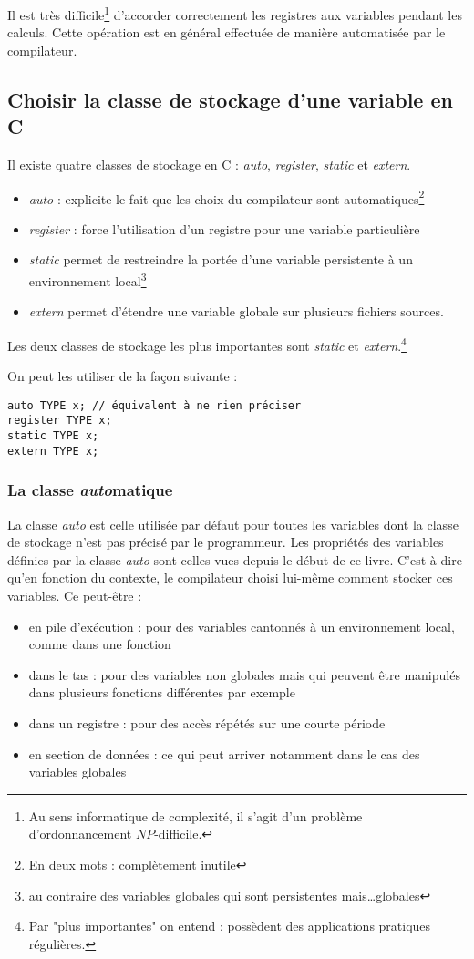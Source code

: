 \documentclass[../../../main.tex]{subfiles}
\begin{document}
Il est très difficile\footnote{Au sens informatique de complexité, il s'agit d'un problème d'ordonnancement $NP$-difficile.} d'accorder correctement les registres aux variables pendant les calculs. Cette opération est en général effectuée de manière automatisée par le compilateur.
\subsection{Choisir la classe de stockage d'une variable en C}
Il existe quatre classes de stockage en C : \textit{auto}, \textit{register}, \textit{static} et \textit{extern}.
\begin{itemize}
	\item \textit{auto} : explicite le fait que les choix du compilateur sont automatiques\footnote{En deux mots : complètement inutile}
	\item \textit{register} : force l'utilisation d'un registre pour une variable particulière
	\item \textit{static} permet de restreindre la portée d'une variable persistente à un environnement local\footnote{au contraire des variables globales qui sont persistentes mais\dots globales}
	\item \textit{extern} permet d'étendre une variable globale sur plusieurs fichiers sources.
\end{itemize}
Les deux classes de stockage les plus importantes sont \textit{static} et \textit{extern}.\footnote{Par "plus importantes" on entend : possèdent des applications pratiques régulières.}

On peut les utiliser de la façon suivante :
\begin{verbatim}
auto TYPE x; // équivalent à ne rien préciser
register TYPE x;
static TYPE x;
extern TYPE x;
\end{verbatim}
\subsubsection{La classe \textit{auto}matique}
La classe \textit{auto} est celle utilisée par défaut pour toutes les variables dont la classe de stockage n'est pas précisé par le programmeur. Les propriétés des variables définies par la classe \textit{auto} sont celles vues depuis le début de ce livre. C'est-à-dire qu'en fonction du contexte, le compilateur choisi lui-même comment stocker ces variables. Ce peut-être : 
\begin{itemize}
	\item en pile d'exécution : pour des variables cantonnés à un environnement local, comme dans une fonction
	\item dans le tas : pour des variables non globales mais qui peuvent être manipulés dans plusieurs fonctions différentes par exemple
	\item dans un registre : pour des accès répétés sur une courte période
	\item en section de données : ce qui peut arriver notamment dans le cas des variables globales
\end{itemize}
\end{document}

